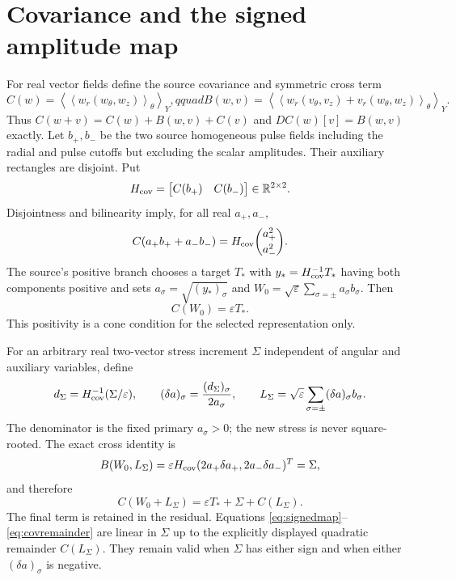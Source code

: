 \documentclass[11pt]{article}
\newcommand{\R}{\mathbb R}
\begin{document}
\section{Covariance and the signed amplitude map}
For real vector fields define the source covariance and symmetric cross term
\begin{equation}
 C(w)=\left\langle\left\langle w_r(w_\theta,w_z)\right\rangle_\theta\right\rangle_Y,qquad
 B(w,v)=\left\langle\left\langle w_r(v_\theta,v_z)+v_r(w_\theta,w_z)\right\rangle_\theta\right\rangle_Y.
 \label{eq:cov}
\end{equation}
Thus $C(w+v)=C(w)+B(w,v)+C(v)$ and $DC(w)[v]=B(w,v)$ exactly.
Let $b_+,b_-$ be the two source homogeneous pulse fields including the radial and pulse
cutoffs but excluding the scalar amplitudes.  Their auxiliary rectangles are disjoint.  Put
\begin{equation}
 H_{\rm cov}=\begin{bmatrix}C(b_+)&C(b_-)\end{bmatrix}\in\R^{2\times2}.
 \label{eq:Hcov}
\end{equation}
Disjointness and bilinearity imply, for all real $a_+,a_-$,
\begin{equation}
 C(a_+b_++a_-b_-)=H_{\rm cov}\binom{a_+^2}{a_-^2}.\label{eq:quadratic}
\end{equation}
The source's positive branch chooses a target $T_*$ with
$y_*=H_{\rm cov}^{-1}T_*$ having both components positive and sets
$a_\sigma=\sqrt{(y_*)_\sigma}$ and
$W_0=\sqrt\varepsilon\sum_{\sigma=\pm}a_\sigma b_\sigma$.  Then
\begin{equation}
 C(W_0)=\varepsilon T_* .\label{eq:leadingcov}
\end{equation}
This positivity is a cone condition for the selected representation only.

For an arbitrary real two-vector stress increment $\Sigma$ independent of angular and
auxiliary variables, define
\begin{equation}
 d_\Sigma=H_{\rm cov}^{-1}(\Sigma/\varepsilon),\qquad
 (\delta a)_\sigma=\frac{(d_\Sigma)_\sigma}{2a_\sigma},\qquad
 L_\Sigma=\sqrt\varepsilon\sum_{\sigma=\pm}(\delta a)_\sigma b_\sigma .
 \label{eq:signedmap}
\end{equation}
The denominator is the fixed primary $a_\sigma>0$; the new stress is never square-rooted.
The exact cross identity is
\begin{equation}
 B(W_0,L_\Sigma)=\varepsilon H_{\rm cov}(2a_+\delta a_+,2a_-\delta a_-)^T=\Sigma,
 \label{eq:rightinverse}
\end{equation}
and therefore
\begin{equation}
 C(W_0+L_\Sigma)=\varepsilon T_*+\Sigma+C(L_\Sigma).\label{eq:covremainder}
\end{equation}
The final term is retained in the residual.  Equations \eqref{eq:signedmap}--\eqref{eq:covremainder}
are linear in $\Sigma$ up to the explicitly displayed quadratic remainder $C(L_\Sigma)$.
They remain valid when $\Sigma$ has either sign and when either $(\delta a)_\sigma$ is
negative.
\end{document}
